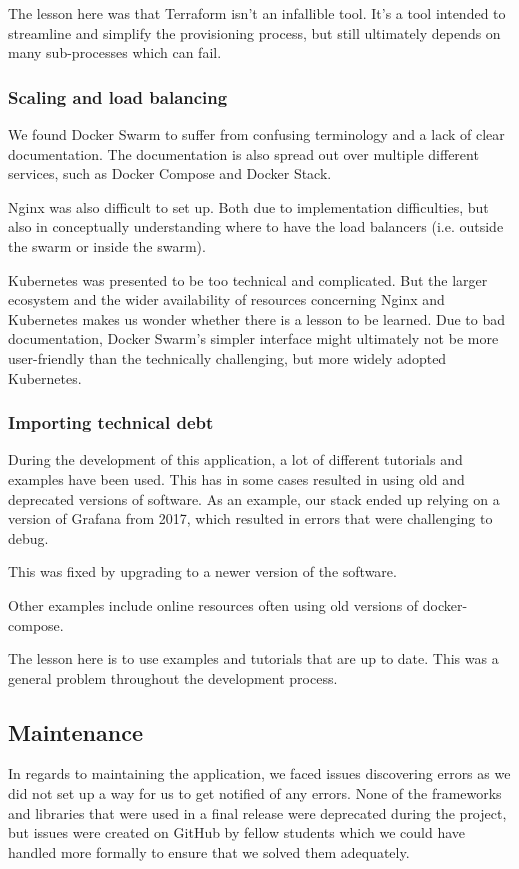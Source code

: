 The lesson here was that Terraform isn't an infallible tool. It's a tool intended to streamline and simplify the provisioning process, but still ultimately depends on many sub-processes which can fail.

\subsubsection{Scaling and load balancing}
We found Docker Swarm to suffer from confusing terminology and a lack of clear documentation. The documentation is also spread out over multiple different services, such as Docker Compose and Docker Stack.

Nginx was also difficult to set up. Both due to implementation difficulties, but also in conceptually understanding where to have the load balancers (i.e. outside the swarm or inside the swarm).

Kubernetes was presented to be too technical and complicated. But the larger ecosystem and the wider availability of resources concerning Nginx and Kubernetes makes us wonder whether there is a lesson to be learned. Due to bad documentation, Docker Swarm's simpler interface might ultimately not be more user-friendly than the technically challenging, but more widely adopted Kubernetes.

\subsubsection{Importing technical debt}
During the development of this application, a lot of different tutorials and examples have been used. This has in some cases resulted in using old and deprecated versions of software. As an example, our stack ended up relying on a version of Grafana from 2017, which resulted in errors that were challenging to debug. 

This was fixed by upgrading to a newer version of the software.

Other examples include online resources often using old versions of docker-compose.

The lesson here is to use examples and tutorials that are up to date. This was a general problem throughout the development process. 

\subsection{Maintenance}
In regards to maintaining the application, we faced issues discovering errors as we did not set up a way for us to get notified of any errors. None of the frameworks and libraries that were used in a final release were deprecated during the project, but issues were created on GitHub by 
fellow students which we could have handled more formally to ensure that we solved them adequately.

